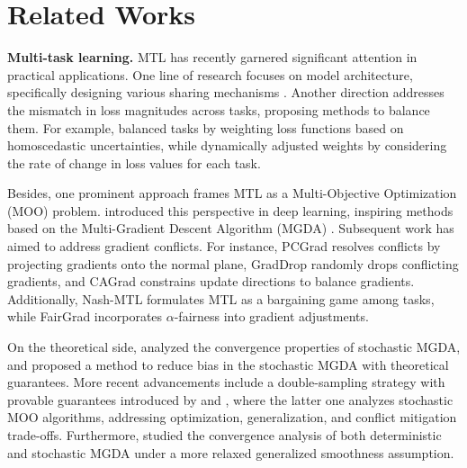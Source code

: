 \section{Related Works}
\textbf{Multi-task learning.} MTL has recently garnered significant attention in practical applications. One line of research focuses on model architecture, specifically designing various sharing mechanisms \citep{kokkinos2017ubernet, ruder2019latent}. Another direction addresses the mismatch in loss magnitudes across tasks, proposing methods to balance them. For example, \citealt{kendall2018multi} balanced tasks by weighting loss functions based on homoscedastic uncertainties, while \citealt{liu2019end} dynamically adjusted weights by considering the rate of change in loss values for each task.

Besides, one prominent approach frames MTL as a Multi-Objective Optimization (MOO) problem. \citealt{sener2018multi} introduced this perspective in deep learning, inspiring methods based on the Multi-Gradient Descent Algorithm (MGDA) \citep{desideri2012multiple}. Subsequent work has aimed to address gradient conflicts. For instance, PCGrad \citep{yu2020gradient} resolves conflicts by projecting gradients onto the normal plane, GradDrop \citep{chen2020just} randomly drops conflicting gradients, and CAGrad \citep{liu2021conflict} constrains update directions to balance gradients. Additionally, Nash-MTL \citep{navon2022multi} formulates MTL as a bargaining game among tasks, while FairGrad \citep{ban2024fair} incorporates $\alpha$-fairness into gradient adjustments.

On the theoretical side, \citealt{zhou2022convergence} analyzed the convergence properties of stochastic MGDA, and \citealt{fernando2023mitigating} proposed a method to reduce bias in the stochastic MGDA with theoretical guarantees. More recent advancements include a double-sampling strategy with provable guarantees introduced by \citealt{xiao2024direction} and \citealt{chen2024three}, where the latter one analyzes stochastic MOO algorithms, addressing optimization, generalization, and conflict mitigation trade-offs. Furthermore, \citealt{zhang2024convergence} studied the convergence analysis of both deterministic and stochastic MGDA under a more relaxed generalized smoothness assumption.

